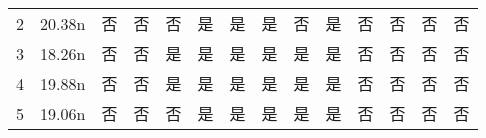 \documentclass[withoutpreface,bwprint]{cumcmthesis} %
\begin{document}
\begin{table}[htbp]
{\begin{tabular}{c|c|cccc|cccc|cccc}
		2                   & 20.38n                & 否                                                 & 否                                                 & 否                                               & 是                                                 & 是                                                 & 是                                                 & 否                                               & 是                                                 & 否                                                 & 否                                                 & 否                                               & 否                                                 \\
		3                   & 18.26n                & 否                                                 & 否                                                 & 是                                               & 是                                                 & 是                                                 & 是                                                 & 是                                               & 是                                                 & 否                                                 & 否                                                 & 否                                               & 否                                                 \\
		4                   & 19.88n                & 否                                                 & 否                                                 & 是                                               & 是                                                 & 是                                                 & 是                                                 & 是                                               & 是                                                 & 否                                                 & 否                                                 & 否                                               & 否                                                 \\
		5                   & 19.06n                & 否                                                 & 否                                                 & 否                                               & 是                                                 & 是                                                 & 是                                                 & 是                                               & 是                                                 & 否                                                 & 否                                                 & 否                                               & 否                                                 \\

\end{tabular}}
\end{table}
\end{document}
